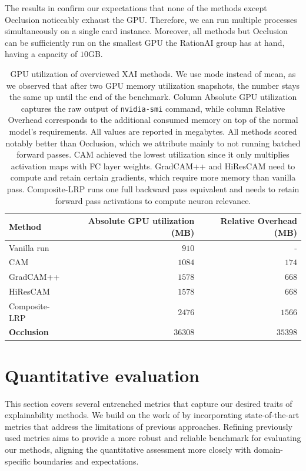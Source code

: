 The results in  confirm our expectations that none of the methods except Occlusion noticeably exhaust the GPU.
Therefore, we can run multiple processes simultaneously on a single card instance.
Moreover, all methods but Occlusion can be sufficiently run on the smallest GPU the RationAI group has at hand, having a capacity of $10$GB.
\begin{table}
\centering
{}
\begin{tabular}{@{} l r r @{}}\toprule
Method & Absolute GPU utilization (MB) & Relative Overhead (MB) \\ 
\midrule
Vanilla run             & $910$      & -       \\
CAM                     & $1084$     & $174$   \\
GradCAM++               & $1578$     & $668$   \\
HiResCAM                & $1578$     & $668$   \\
Composite-LRP           & $2476$     & $1566$  \\
\textbf{Occlusion}      & $36308$    & $35398$ \\
\bottomrule
\end{tabular}
\caption{
GPU utilization of overviewed XAI methods. We use mode instead of mean, as we observed that after two GPU memory utilization snapshots, the number stays the same up until the end of the benchmark. Column Absolute GPU utilization captures the raw output of \texttt{nvidia-smi} command, while column Relative Overhead corresponds to the additional consumed memory on top of the normal model's requirements. All values are reported in megabytes. All methods scored notably better than Occlusion, which we attribute mainly to not running batched forward passes. CAM achieved the lowest utilization since it only multiplies activation maps with FC layer weights. GradCAM++ and HiResCAM need to compute and retain certain gradients, which require more memory than vanilla pass. Composite-LRP runs one full backward pass equivalent and needs to retain forward pass activations to compute neuron relevance.
}
\label{tab:gpu-util}
\end{table}


\section{Quantitative evaluation}

This section covers several entrenched metrics that capture our desired traits of explainability methods.
We build on the work of \cite{gallo} by incorporating state-of-the-art metrics that address the limitations of previous approaches.
Refining previously used metrics aims to provide a more robust and reliable benchmark for evaluating our methods, aligning the quantitative assessment more closely with domain-specific boundaries and expectations.

